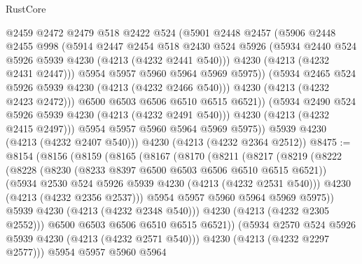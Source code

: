 \begin{lexlean}{RustCore}
\begin{coremodule}
                  @2459
                  @2472
                  @2479
                  @518
                  @2422
                  @524
                  (@5901
                    @2448
                    @2457
                    (@5906
                      @2448
                      @2455
                      @998
                      (@5914
                        @2447
                        @2454
                        @518
                        @2430
                        @524
                        @5926
                        (@5934 @2440 @524 @5926 @5939 @4230 (@4213 (@4232 @2441 @540)))
                        @4230
                        (@4213 (@4232 @2431 @2447)))
                      @5954
                      @5957
                      @5960
                      @5964
                      @5969
                      @5975))
                  (@5934 @2465 @524 @5926 @5939 @4230 (@4213 (@4232 @2466 @540)))
                  @4230
                  (@4213 (@4232 @2423 @2472)))
                @6500
                @6503
                @6506
                @6510
                @6515
                @6521))
            (@5934 @2490 @524 @5926 @5939 @4230 (@4213 (@4232 @2491 @540)))
            @4230
            (@4213 (@4232 @2415 @2497)))
          @5954
          @5957
          @5960
          @5964
          @5969
          @5975))
      @5939
      @4230
      (@4213 (@4232 @2407 @540)))
    @4230
    (@4213 (@4232 @2364 @2512))
@8475 := @8154
    (@8156
      (@8159
        (@8165
          (@8167
            (@8170
              (@8211
                (@8217
                  (@8219
                    (@8222
                      (@8228
                        (@8230 (@8233 @8397 @6500 @6503 @6506 @6510 @6515 @6521))
                        (@5934 @2530 @524 @5926 @5939 @4230 (@4213 (@4232 @2531 @540)))
                        @4230
                        (@4213 (@4232 @2356 @2537)))
                      @5954
                      @5957
                      @5960
                      @5964
                      @5969
                      @5975))
                  @5939
                  @4230
                  (@4213 (@4232 @2348 @540)))
                @4230
                (@4213 (@4232 @2305 @2552)))
              @6500
              @6503
              @6506
              @6510
              @6515
              @6521))
          (@5934 @2570 @524 @5926 @5939 @4230 (@4213 (@4232 @2571 @540)))
          @4230
          (@4213 (@4232 @2297 @2577)))
        @5954
        @5957
        @5960
        @5964

\end{coremodule}
\end{lexlean}
